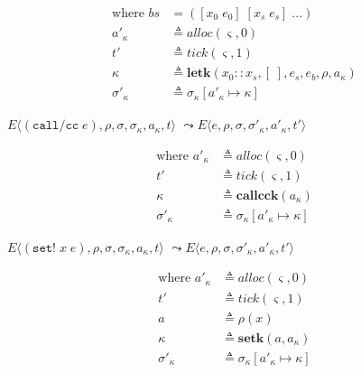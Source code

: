 \documentclass[12pt,draft]{article}
\newcommand{\callccsyn}[1]{(\texttt{call/cc}\;#1)}
\newcommand{\setsyn}[2]{(\texttt{set!}\;#1\;#2)}
\begin{document}
{\begin{multicols*}{2}
\vspace{-5mm}
\begin{align*}
  \text{where }
  bs &= ([x_0\;e_0]\;[x_s\;e_s]\;...) \\
  a'_\kappa &\triangleq alloc(\varsigma, 0) \\
  t' &\triangleq tick(\varsigma, 1) \\
  \kappa &\triangleq \textbf{letk}(x_0::x_s, [\;], e_s, e_b, \rho, a_\kappa) \\
  \sigma'_\kappa &\triangleq \sigma_\kappa[a'_\kappa \mapsto \kappa]
\end{align*}
\begin{center}
  $E\langle \callccsyn{e} , \rho , \sigma , \sigma_\kappa , a_\kappa , t \rangle$
  $\leadsto E\langle e , \rho , \sigma , \sigma'_\kappa , a'_\kappa , t' \rangle$
\end{center}
\vspace{-5mm}
\begin{align*}
  \text{where }
  a'_\kappa &\triangleq alloc(\varsigma, 0) \\
  t' &\triangleq tick(\varsigma, 1) \\
  \kappa &\triangleq \textbf{callcck}(a_\kappa) \\
  \sigma'_\kappa &\triangleq \sigma_\kappa[a'_\kappa \mapsto \kappa]
\end{align*}
\begin{center}
  $E\langle \setsyn{x}{e} , \rho , \sigma , \sigma_\kappa , a_\kappa , t \rangle$
  $\leadsto E\langle e , \rho , \sigma , \sigma'_\kappa , a'_\kappa , t' \rangle$
\end{center}
\vspace{-5mm}
\begin{align*}
  \text{where }
  a'_\kappa &\triangleq alloc(\varsigma, 0) \\
  t' &\triangleq tick(\varsigma, 1) \\
  a &\triangleq \rho(x) \\
  \kappa &\triangleq \textbf{setk}(a, a_\kappa) \\
  \sigma'_\kappa &\triangleq \sigma_\kappa[a'_\kappa \mapsto \kappa]
\end{align*}


\vfill\null
\columnbreak


\end{multicols*}}
\end{document}
